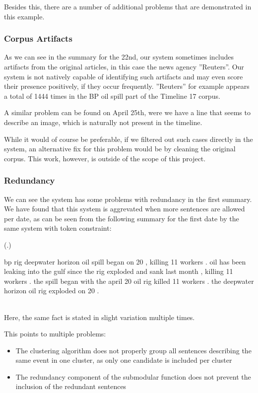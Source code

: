 \documentclass[a4paper,BCOR=10mm]{report}
\newcounter{quotecount}[chapter]
\newcommand{\countquote}[1]{\vspace{1cm}\refstepcounter{quotecount}%
     (\thechapter.\arabic{quotecount}) \hspace*{1cm} \parbox{9cm}{#1}\\[1cm]}
\numberwithin{lemma}{chapter}
\numberwithin{definition}{chapter}
\begin{document}
Besides this, there are a number of additional problems that are demonstrated in this example.

\subsubsection{Corpus Artifacts}

As we can see in the summary for the 22nd, our system sometimes includes artifacts from the original articles, in this case the news agency ''Reuters''. Our system is not natively capable of identifying such artifacts and may even score their presence positively, if they occur frequently.
''Reuters'' for example appears a total of 1444 times in the BP oil spill part of the Timeline 17 corpus.

A similar problem can be found on April 25th, were we have a line that seems to describe an image, which is naturally not present in the timeline.

While it would of course be preferable, if we filtered out such cases directly in the system, an alternative fix for this problem would be by cleaning the original corpus. This work, however, is outside of the scope of this project.

\subsubsection{Redundancy}

We can see the system has some problems with redundancy in the first summary. We have found that this system is aggrevated when more sentences are allowed per date, as can be seen from the following summary for the first date by the same system with token constraint:

\countquote{
bp rig deepwater horizon oil spill began on 20 , killing 11 workers .
oil has been leaking into the gulf since the rig exploded and sank last month , killing 11 workers .
the spill began with the april 20 oil rig killed 11 workers .
the deepwater horizon oil rig exploded on 20 .
}

Here, the same fact is stated in slight variation multiple times.

This points to multiple problems:

\begin{itemize}
    \item{The clustering algorithm does not properly group all sentences describing the same event in one cluster, as only one candidate is included per cluster }
    \item{The redundancy component of the submodular function does not prevent the inclusion of the redundant sentences }
\end{itemize}
\end{document}
